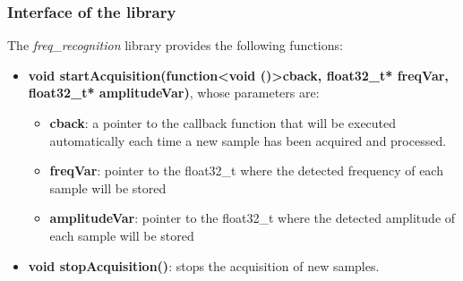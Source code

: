 \subsubsection{Interface of the library}
The \textit{freq\_recognition} library provides the following functions:
\begin{itemize}
	\item \textbf{void startAcquisition(function\textless void ()\textgreater cback, float32\_t* freqVar, float32\_t* amplitudeVar)}, whose parameters are:
	\begin{itemize}
		\item \textbf{cback}: a pointer to the callback function that will be executed automatically each time a new sample has been acquired and processed.
		\item \textbf{freqVar}: pointer to the float32\_t where the detected frequency of each sample will be stored
		\item \textbf{amplitudeVar}: pointer to the float32\_t where the detected amplitude of each sample will be stored
	\end{itemize}
\item \textbf{void stopAcquisition()}: stops the acquisition of new samples.
\end{itemize}

